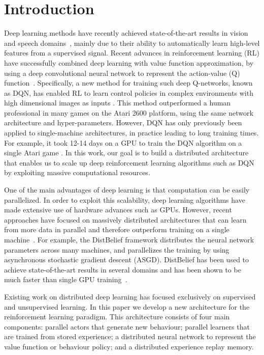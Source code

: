 \section{Introduction}
\label{submission}

Deep learning methods have recently achieved state-of-the-art results in vision and speech domains~\cite{krizhevsky-imagenet,simonyan-deep,szegedy-deep,graves2013speech,dahl2012context}, mainly due to their ability to automatically learn high-level features from a supervised signal. Recent advances in reinforcement learning (RL) have successfully combined deep learning with value function approximation, by using a deep convolutional neural network to represent the action-value (Q) function~\cite{mnih2013atari}. Specifically, a new method for training such deep Q-networks, known as DQN, has enabled RL to learn control policies in complex environments with high dimensional images as inputs \cite{mnih-dqn-2015}. This method outperformed a human professional in many games on the Atari 2600 platform, using the same network architecture and hyper-parameters. However, DQN has only previously been applied to single-machine architectures, in practice leading to long training times. For example, it took 12-14 days on a GPU to train the DQN algorithm on a single Atari game \cite{mnih-dqn-2015}. In this work, our goal is to build a distributed architecture that enables us to scale up deep reinforcement learning algorithms such as DQN by exploiting massive computational resources.

One of the main advantages of deep learning is that computation can be easily parallelized. In order to exploit this scalability, deep learning algorithms have made extensive use of hardware advances such as GPUs. However, recent approaches have focused on massively distributed architectures that can learn from more data in parallel and therefore outperform training on a single machine~\cite{coates2013deep,dean2012distbelief}. For example, the DistBelief framework \cite{dean2012distbelief} distributes the neural network parameters across many machines, and parallelizes the training by using  asynchronous stochastic gradient descent (ASGD). DistBelief has been used to achieve state-of-the-art results in several domains \cite{szegedy-deep} and has been shown to be much faster than single GPU training~\cite{dean2012distbelief}.

Existing work on distributed deep learning has focused exclusively on supervised and unsupervised learning. In this paper we develop a new architecture for the reinforcement learning paradigm. This architecture consists of four main components: parallel actors that generate new behaviour; parallel learners that are trained from stored experience; a distributed neural network to represent the value function or behaviour policy; and a distributed experience replay memory. 

